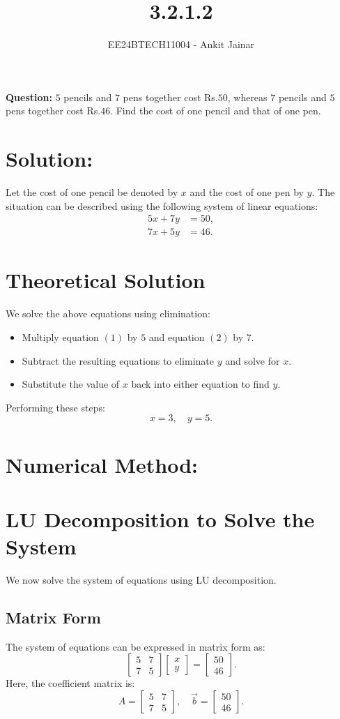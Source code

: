 \documentclass[journal]{IEEEtran}
\newcommand{\myvec}[1]{\begin{bmatrix}#1\end{bmatrix}}
\begin{document}
\title{3.2.1.2}
\author{EE24BTECH11004 - Ankit Jainar}
\maketitle

\textbf{Question:} \(5\) pencils and \(7\) pens together cost Rs.\(50\), whereas \(7\) pencils and \(5\) pens together cost Rs.\(46\). Find the cost of one pencil and that of one pen.\\

\section*{Solution:}
Let the cost of one pencil be denoted by \(x\) and the cost of one pen by \(y\).  
The situation can be described using the following system of linear equations:
\begin{align}
    5x + 7y &= 50, \tag{1} \\
    7x + 5y &= 46. \tag{2}
\end{align}

\section{Theoretical Solution}
We solve the above equations using elimination:
\begin{itemize}
    \item Multiply equation \((1)\) by \(5\) and equation \((2)\) by \(7\).
    \item Subtract the resulting equations to eliminate \(y\) and solve for \(x\).
    \item Substitute the value of \(x\) back into either equation to find \(y\).
\end{itemize}

Performing these steps:
\[
x = 3, \quad y = 5.
\]
\section{Numerical Method:}
\section{LU Decomposition to Solve the System}
We now solve the system of equations using LU decomposition.

\subsection{Matrix Form}
The system of equations can be expressed in matrix form as:
\begin{equation}
    \myvec{
    5 & 7 \\
    7 & 5
    } \myvec{x \\ y} = \myvec{50 \\ 46}.
\end{equation}
Here, the coefficient matrix is:
\begin{equation}
    A = \myvec
    {5 & 7 \\
    7 & 5}, \quad \vec{b} = \myvec{50 \\ 46}.
\end{equation}
\end{document}
